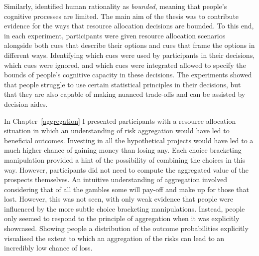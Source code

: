 \documentclass[a4paper, nobind, dvipsnames]{templates/ociamthesis}
\theoremstyle{definition}
\theoremstyle{definition}
\theoremstyle{definition}
\theoremstyle{definition}
\theoremstyle{remark}
\begin{document}
Similarly, \textcite{simon1955} identified human rationality as \emph{bounded}, meaning that
people's cognitive processes are limited. The main aim of the thesis was to
contribute evidence for the ways that resource allocation decisions are bounded.
To this end, in each experiment, participants were given resource allocation
scenarios alongside both cues that describe their options and cues that frame
the options in different ways. Identifying which cues were used by participants
in their decisions, which cues were ignored, and which cues were integrated
allowed to specify the bounds of people's cognitive capacity in these decisions.
The experiments showed that people struggle to use certain statistical
principles in their decisions, but that they are also capable of making nuanced
trade-offs and can be assisted by decision aides.

In Chapter~\ref{aggregation} I presented participants with a resource
allocation situation in which an understanding of risk aggregation would have
led to beneficial outcomes. Investing in all the hypothetical projects would
have led to a much higher chance of gaining money than losing any. Each choice
bracketing manipulation provided a hint of the possibility of combining the
choices in this way. However, participants did not need to compute the
aggregated value of the prospects themselves. An intuitive understanding of
aggregation involved considering that of all the gambles some will pay-off and
make up for those that lost. However, this was not seen, with only weak evidence
that people were influenced by the more subtle choice bracketing manipulations.
Instead, people only seemed to respond to the principle of aggregation when it
was explicitly showcased. Showing people a distribution of the outcome
probabilities explicitly visualised the extent to which an aggregation of the
risks can lead to an incredibly low chance of loss.
\end{document}
